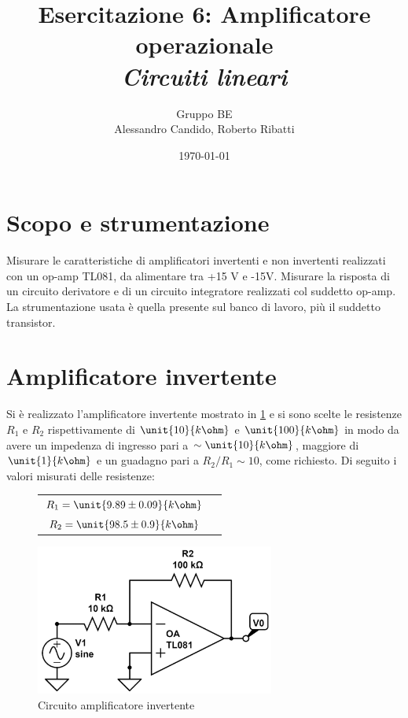 \documentclass[10pt,a4paper]{article}
\title{Esercitazione 6: Amplificatore operazionale \\ \Large \emph{Circuiti lineari}}
\author{Gruppo BE \\ Alessandro Candido, Roberto Ribatti}
\date{\today}
\begin{document}
\maketitle

\section{Scopo e strumentazione}
Misurare le caratteristiche di amplificatori invertenti e non invertenti realizzati con un op-amp TL081, da alimentare tra +15 V e -15V. Misurare la risposta di un circuito derivatore e di un circuito integratore realizzati col suddetto op-amp.
La strumentazione usata è quella presente sul banco di lavoro, più il suddetto transistor.

\section{Amplificatore invertente}
Si è realizzato l'amplificatore invertente mostrato in \figurename{\ref{circuito_amp_inv}} e si sono scelte le resistenze $R_1$ e $R_2$ rispettivamente di $\unit{10}{k\ohm}$ e $\unit{100}{k\ohm}$ in modo da avere un impedenza di ingresso pari a $\sim \unit{10}{k\ohm}$, maggiore di $\unit{1}{k\ohm}$ e un guadagno pari a $R_2/R_1 \sim 10$, come richiesto. Di seguito i valori misurati delle resistenze:
\begin{figure}[H]
\begin{minipage}{0.49\textwidth}
	\centering
	\begin{tabular}{cc}
		$R_1 = \unit{9.89 \pm 0.09}{k\ohm}$  \\ $R_2 = \unit{98.5 \pm 0.9}{k\ohm}$
	\end{tabular}
\end{minipage}
\begin{minipage}{0.49\textwidth}
	\centering
	\includegraphics[width=0.7\textwidth]{../grafici/inv_amp_circuito.jpg}
	\caption{Circuito amplificatore invertente}
	\label{circuito_amp_inv}
\end{minipage}
\end{figure}
\end{document}
